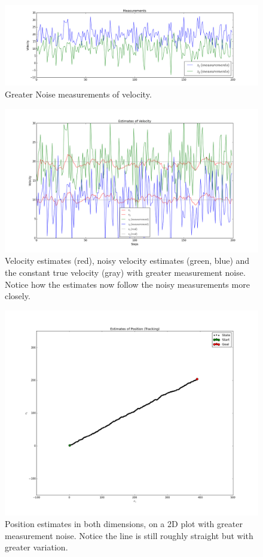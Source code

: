 \documentclass{article}
\begin{document}
\begin{figure}[H]
  \includegraphics[width=\linewidth]{measurements_greater_noise.png}
  \caption{Greater Noise measurements of velocity.}
  \label{fig:m5}
\end{figure}

\begin{figure}[H]
  \includegraphics[width=\linewidth]{velocity_states_tracking_greater_noise.png}
  \caption{Velocity estimates (red), noisy velocity estimates (green, blue) and the constant true velocity (gray) with greater measurement noise. Notice how the estimates now follow the noisy measurements more closely.}
  \label{fig:m6}
\end{figure}


\begin{figure}[H]
  \includegraphics[width=\linewidth]{position_tracking_greater_noise.png}
  \caption{Position estimates in both dimensions, on a 2D plot with greater measurement noise. Notice the line is still roughly straight but with greater variation.}
  \label{fig:m4}
\end{figure}
\end{document}
